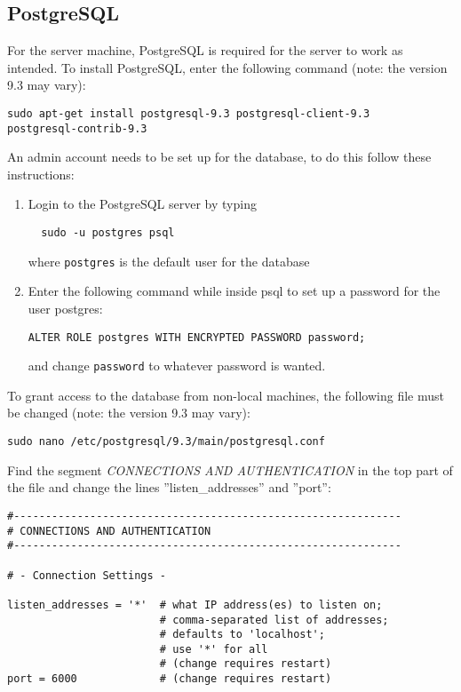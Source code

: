 \subsection{PostgreSQL}
For the server machine, PostgreSQL is required for the server to work as intended. To install PostgreSQL, enter the following command (note: the version 9.3 may vary):
\begin{verbatim}
sudo apt-get install postgresql-9.3 postgresql-client-9.3
postgresql-contrib-9.3 

\end{verbatim}

An admin account needs to be set up for the database, to do this follow these instructions:

\begin{enumerate}
\item Login to the PostgreSQL server by typing \begin{verbatim}  sudo -u postgres psql \end{verbatim}
where \texttt{postgres} is the default user for the database
\item Enter the following command while inside psql to set up a password for the user postgres:
\begin{verbatim}
ALTER ROLE postgres WITH ENCRYPTED PASSWORD password;
\end{verbatim}
and change \texttt{password} to whatever password is wanted.
\end{enumerate}

To grant access to the database from non-local machines, the following file must be changed (note: the version 9.3 may vary):
\begin{verbatim}
sudo nano /etc/postgresql/9.3/main/postgresql.conf
\end{verbatim}
Find the segment \emph{CONNECTIONS AND AUTHENTICATION} in the top part of the file and change the lines ''listen\_addresses'' and ''port'':

\begin{verbatim}
#-------------------------------------------------------------
# CONNECTIONS AND AUTHENTICATION
#-------------------------------------------------------------

# - Connection Settings -

listen_addresses = '*'  # what IP address(es) to listen on;
                        # comma-separated list of addresses;
                        # defaults to 'localhost';
                        # use '*' for all
                        # (change requires restart)
port = 6000             # (change requires restart)

\end{verbatim}


